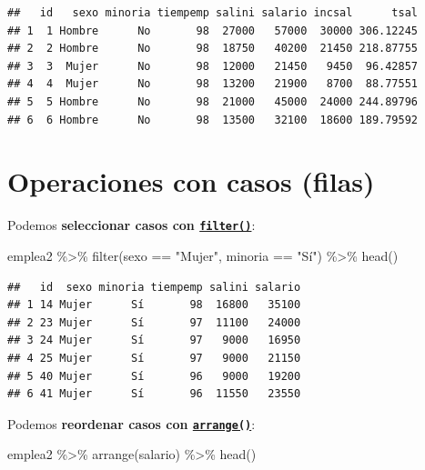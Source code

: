 \documentclass[
]{book}
\newenvironment{Shaded}{\begin{snugshade}}{\end{snugshade}}
\newcommand{\FunctionTok}[1]{\textcolor[rgb]{0.00,0.00,0.00}{#1}}
\newcommand{\NormalTok}[1]{#1}
\newcommand{\SpecialCharTok}[1]{\textcolor[rgb]{0.00,0.00,0.00}{#1}}
\newcommand{\StringTok}[1]{\textcolor[rgb]{0.31,0.60,0.02}{#1}}
\theoremstyle{break}
\theoremstyle{nonumberplain}
\begin{document}
\begin{verbatim}
##   id   sexo minoria tiempemp salini salario incsal      tsal
## 1  1 Hombre      No       98  27000   57000  30000 306.12245
## 2  2 Hombre      No       98  18750   40200  21450 218.87755
## 3  3  Mujer      No       98  12000   21450   9450  96.42857
## 4  4  Mujer      No       98  13200   21900   8700  88.77551
## 5  5 Hombre      No       98  21000   45000  24000 244.89796
## 6  6 Hombre      No       98  13500   32100  18600 189.79592
\end{verbatim}

\hypertarget{dplyr-casos}{%
\section{Operaciones con casos (filas)}\label{dplyr-casos}}

Podemos \textbf{seleccionar casos con \href{https://dplyr.tidyverse.org/reference/filter.html}{\texttt{filter()}}}:

\begin{Shaded}
\begin{Highlighting}[]
\NormalTok{emplea2 }\SpecialCharTok{\%\textgreater{}\%} \FunctionTok{filter}\NormalTok{(sexo }\SpecialCharTok{==} \StringTok{"Mujer"}\NormalTok{, minoria }\SpecialCharTok{==} \StringTok{"Sí"}\NormalTok{) }\SpecialCharTok{\%\textgreater{}\%} \FunctionTok{head}\NormalTok{()}
\end{Highlighting}
\end{Shaded}

\begin{verbatim}
##   id  sexo minoria tiempemp salini salario
## 1 14 Mujer      Sí       98  16800   35100
## 2 23 Mujer      Sí       97  11100   24000
## 3 24 Mujer      Sí       97   9000   16950
## 4 25 Mujer      Sí       97   9000   21150
## 5 40 Mujer      Sí       96   9000   19200
## 6 41 Mujer      Sí       96  11550   23550
\end{verbatim}

Podemos \textbf{reordenar casos con \href{https://dplyr.tidyverse.org/reference/arrange.html}{\texttt{arrange()}}}:

\begin{Shaded}
\begin{Highlighting}[]
\NormalTok{emplea2 }\SpecialCharTok{\%\textgreater{}\%} \FunctionTok{arrange}\NormalTok{(salario) }\SpecialCharTok{\%\textgreater{}\%} \FunctionTok{head}\NormalTok{()}
\end{Highlighting}
\end{Shaded}
\end{document}
